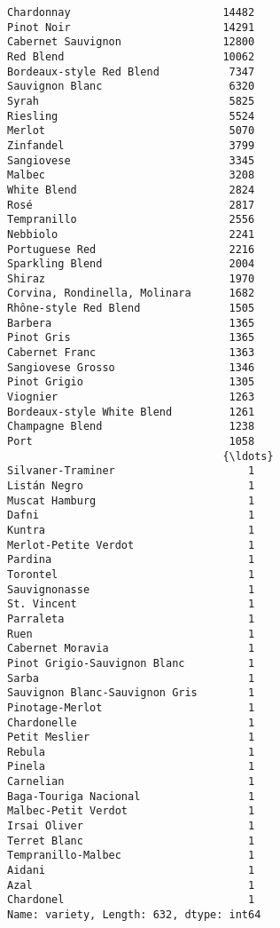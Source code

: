 \documentclass[11pt]{article}
\begin{document}
    \begin{Verbatim}[commandchars=\\\{\}]
Chardonnay                        14482
Pinot Noir                        14291
Cabernet Sauvignon                12800
Red Blend                         10062
Bordeaux-style Red Blend           7347
Sauvignon Blanc                    6320
Syrah                              5825
Riesling                           5524
Merlot                             5070
Zinfandel                          3799
Sangiovese                         3345
Malbec                             3208
White Blend                        2824
Rosé                               2817
Tempranillo                        2556
Nebbiolo                           2241
Portuguese Red                     2216
Sparkling Blend                    2004
Shiraz                             1970
Corvina, Rondinella, Molinara      1682
Rhône-style Red Blend              1505
Barbera                            1365
Pinot Gris                         1365
Cabernet Franc                     1363
Sangiovese Grosso                  1346
Pinot Grigio                       1305
Viognier                           1263
Bordeaux-style White Blend         1261
Champagne Blend                    1238
Port                               1058
                                  {\ldots}  
Silvaner-Traminer                     1
Listán Negro                          1
Muscat Hamburg                        1
Dafni                                 1
Kuntra                                1
Merlot-Petite Verdot                  1
Pardina                               1
Torontel                              1
Sauvignonasse                         1
St. Vincent                           1
Parraleta                             1
Ruen                                  1
Cabernet Moravia                      1
Pinot Grigio-Sauvignon Blanc          1
Sarba                                 1
Sauvignon Blanc-Sauvignon Gris        1
Pinotage-Merlot                       1
Chardonelle                           1
Petit Meslier                         1
Rebula                                1
Pinela                                1
Carnelian                             1
Baga-Touriga Nacional                 1
Malbec-Petit Verdot                   1
Irsai Oliver                          1
Terret Blanc                          1
Tempranillo-Malbec                    1
Aidani                                1
Azal                                  1
Chardonel                             1
Name: variety, Length: 632, dtype: int64

    \end{Verbatim}
\end{document}
